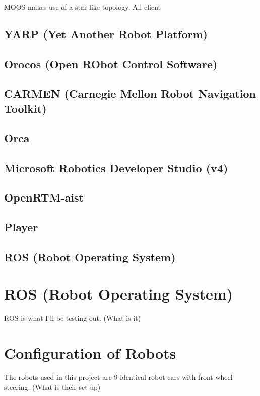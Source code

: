 \documentclass{l4proj}
\begin{document}
MOOS makes use of a star-like topology. All client 

\subsection{YARP (Yet Another Robot Platform)}

\subsection{Orocos (Open RObot Control Software)}

\subsection{CARMEN (Carnegie Mellon Robot Navigation Toolkit)}

\subsection{Orca}

\subsection{Microsoft Robotics Developer Studio (v4)}

\subsection{OpenRTM-aist}

\subsection{Player}

\subsection{ROS (Robot Operating System)}


\section{ROS (Robot Operating System)}

ROS is what I'll be testing out. (What is it)

\section{Configuration of Robots}

The robots used in this project are 9 identical robot cars with front-wheel steering. (What is their set up)
\end{document}
